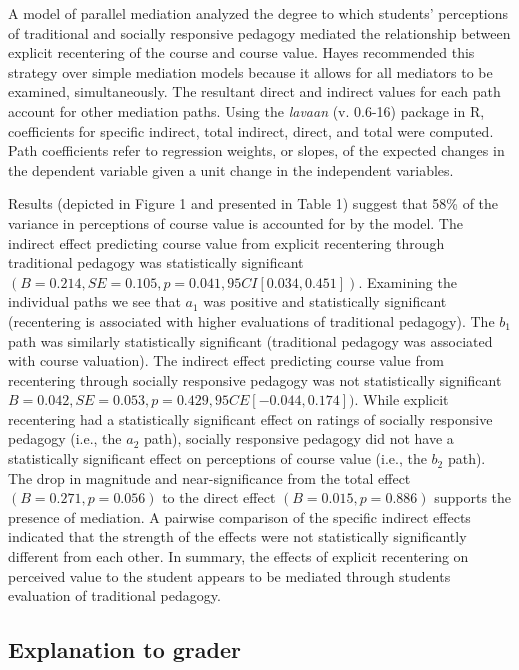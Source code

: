 \documentclass[
  11pt,
]{book}
\begin{document}
A model of parallel mediation analyzed the degree to which students' perceptions of traditional and socially responsive pedagogy mediated the relationship between explicit recentering of the course and course value. Hayes \citeyearpar{hayes_more_2022} recommended this strategy over simple mediation models because it allows for all mediators to be examined, simultaneously. The resultant direct and indirect values for each path account for other mediation paths. Using the \emph{lavaan} (v. 0.6-16) package in R, coefficients for specific indirect, total indirect, direct, and total were computed. Path coefficients refer to regression weights, or slopes, of the expected changes in the dependent variable given a unit change in the independent variables.

Results (depicted in Figure 1 and presented in Table 1) suggest that 58\% of the variance in perceptions of course value is accounted for by the model. The indirect effect predicting course value from explicit recentering through traditional pedagogy was statistically significant \((B = 0.214, SE = 0.105, p = 0.041, 95CI [0.034, 0.451])\). Examining the individual paths we see that \(a_{1}\) was positive and statistically significant (recentering is associated with higher evaluations of traditional pedagogy). The \(b_{1}\) path was similarly statistically significant (traditional pedagogy was associated with course valuation). The indirect effect predicting course value from recentering through socially responsive pedagogy was not statistically significant \(B = 0.042, SE = 0.053, p = 0.429, 95CE[-0.044, 0.174])\). While explicit recentering had a statistically significant effect on ratings of socially responsive pedagogy (i.e., the \(a_{2}\) path), socially responsive pedagogy did not have a statistically significant effect on perceptions of course value (i.e., the \(b_{2}\) path). The drop in magnitude and near-significance from the total effect \((B = 0.271, p = 0.056)\) to the direct effect \((B = 0.015, p = 0.886)\) supports the presence of mediation. A pairwise comparison of the specific indirect effects indicated that the strength of the effects were not statistically significantly different from each other. In summary, the effects of explicit recentering on perceived value to the student appears to be mediated through students evaluation of traditional pedagogy.

\hypertarget{explanation-to-grader-1}{%
\subsection*{Explanation to grader}\label{explanation-to-grader-1}}
\end{document}
